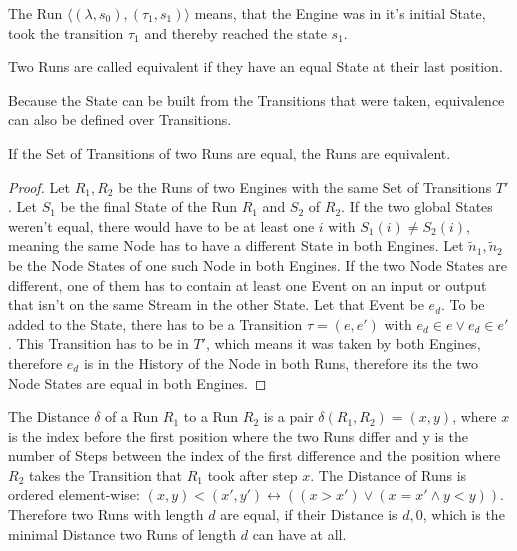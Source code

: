 The Run \(\langle (\lambda, s_0), (\tau_1, s_1) \rangle\) means, that the Engine was in it's initial State, took the transition \(\tau_1\) and thereby reached the state \(s_1\).

\begin{definition}[name = Equivalence of Runs]\label{def:equivalence_runs}
  Two Runs are called equivalent if they have an equal State at their last position.
\end{definition}

Because the State can be built from the Transitions that were taken, equivalence can also be defined over Transitions.

\begin{lemma}[name = Equivalence of Runs over Transitions]\label{lemma:equivalent_runs_with_transitions}
  If the Set of Transitions of two Runs are equal, the Runs are equivalent.
\end{lemma}

\begin{proof}
  Let \(R_1, R_2\) be the Runs of two Engines with the same Set of Transitions \(T'\).
  Let \(S_1\) be the final State of the Run \(R_1\) and \(S_2\) of \(R_2\).
  If the two global States weren't equal, there would have to be at least one \(i\) with \(S_1(i) \neq S_2(i)\), meaning the same Node has to have a different State in both Engines.
  Let \(\widetilde{n}_1, \widetilde{n}_2\) be the Node States of one such Node in both Engines.
  If the two Node States are different, one of them has to contain at least one Event on an input or output that isn't on the same Stream in the other State.
  Let that Event be \(e_d\).
  To be added to the State, there has to be a Transition \(\tau = (e, e')\) with \(e_d \in e \lor e_d \in e'\).
  This Transition has to be in \(T'\), which means it was taken by both Engines, therefore \(e_d\) is in the History of the Node in both Runs, therefore its the two Node States are equal in both Engines.
\end{proof}

\begin{definition}[name = Distance of Runs]\label{def:runs_distance}
  The Distance \(\delta\) of a Run \(R_1\) to a Run \(R_2\) is a pair \(\delta(R_1,R_2) = (x,y)\), where \(x\) is the index before the first position where the two Runs differ and y is the number of Steps between the index of the first difference and the position where \(R_2\) takes the Transition that \(R_1\) took after step \(x\).
  The Distance of Runs is ordered element-wise: \((x,y) < (x',y') \leftrightarrow ((x > x') \lor (x = x' \land y < y))\).
  Therefore two Runs with length \(d\) are equal, if their Distance is \(d,0\), which is the minimal Distance two Runs of length \(d\) can have at all.
\end{definition}

